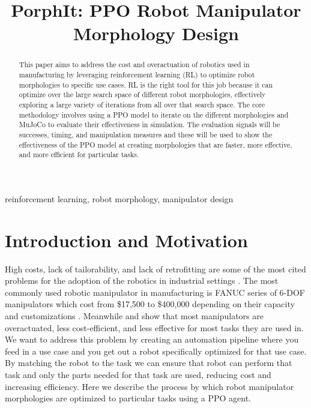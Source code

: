 \documentclass[conference]{IEEEtran}
\begin{document}
\title{PorphIt: PPO Robot Manipulator Morphology Design}

\author{
\and
{}
}

\maketitle

\begin{abstract}
This paper aims to address the cost and overactuation of robotics used in manufacturing by leveraging reinforcement learning (RL) to optimize robot morphologies to specific use cases.
RL is the right tool for this job because it can optimize over the large search space of different robot morphologies, effectively exploring a large variety of iterations from all over that search space.
The core methodology involves using a PPO model to iterate on the different morphologies and MuJoCo to evaluate their effectiveness in simulation.
The evaluation signals will be successes, timing, and manipulation measures and these will be used to show the effectiveness of the PPO model at creating morphologies that are faster, more effective, and more efficient for particular tasks.
\end{abstract}

\begin{IEEEkeywords}
reinforcement learning, robot morphology, manipulator design
\end{IEEEkeywords}

\section{Introduction and Motivation}
High costs, lack of tailorability, and lack of retrofitting are some of the most cited problems for the adoption of the robotics in industrial settings \cite{mckinsey2019industrial}.
The most commonly used robotic manipulator in manufacturing is FANUC series of 6-DOF manipulators which cost from \$17,500 to \$400,000 depending on their capacity and customizations \cite{standardbots2025fanucprice}\cite{patentpc2025toprobotics}.
Meanwhile \cite{russo2021task} and \cite{he2019underactuated} show that most manipulators are overactuated, less cost-efficient, and less effective for most tasks they are used in.
We want to address this problem by creating an automation pipeline where you feed in a use case and you get out a robot specifically optimized for that use case.
By matching the robot to the task we can ensure that robot can perform that task and only the parts needed for that task are used, reducing cost and increasing efficiency.
Here we describe the process by which robot manipulator morphologies are optimized to particular tasks using a PPO agent.
\end{document}
